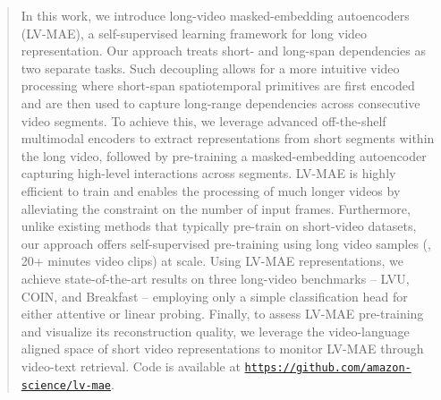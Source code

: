 \begin{abstract}
In this work, we introduce long-video masked-embedding autoencoders (LV-MAE), a self-supervised learning framework for long video representation.
Our approach treats short- and long-span dependencies as two separate tasks.
Such decoupling allows for a more intuitive video processing where short-span spatiotemporal primitives are first encoded and are then used to capture long-range dependencies across consecutive video segments. 
To achieve this, we leverage advanced off-the-shelf multimodal encoders to extract representations from short segments within the long video, followed by pre-training a masked-embedding autoencoder capturing high-level interactions across segments.
LV-MAE is highly efficient to train and enables the processing of much longer videos by alleviating the constraint on the number of input frames.
Furthermore, unlike existing methods that typically pre-train on short-video datasets, our approach offers self-supervised pre-training using long video samples (\eg, 20+ minutes video clips) at scale.
Using LV-MAE representations, we achieve state-of-the-art results on three long-video benchmarks -- LVU, COIN, and Breakfast -- employing only a simple classification head for either attentive or linear probing.
Finally, to assess LV-MAE pre-training and visualize its reconstruction quality, we leverage the video-language aligned space of short video representations to monitor LV-MAE through video-text retrieval. Code is available at \href{https://github.com/amazon-science/lv-mae}{\textcolor{LightRed}{\texttt{https://github.com/amazon-science/lv-mae}}}.

\end{abstract}